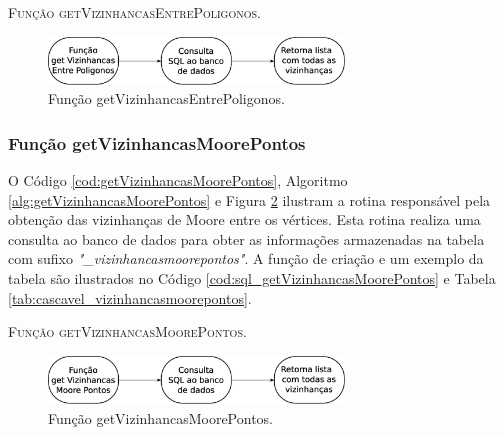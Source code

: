 \begin{algorithm}[H]
   \SetAlgoLined   
   
   \caption{\textsc{Função getVizinhancasEntrePoligonos.}}
   \label{alg:getVizinhancasEntrePoligonos}
\end{algorithm}

\begin{figure}[H]
  \centering
  \includegraphics[width=0.7\textwidth]{Figuras/Simula/Fluxos/getVizinhancasEntrePoligonos.eps}
  \caption{Função getVizinhancasEntrePoligonos.}
  \label{fig:getVizinhancasEntrePoligonos}
\end{figure} 

\newpage

\subsubsection{Função getVizinhancasMoorePontos}

O Código \ref{cod:getVizinhancasMoorePontos}, Algoritmo \ref{alg:getVizinhancasMoorePontos} e Figura \ref{fig:getVizinhancasMoorePontos} ilustram a rotina responsável pela obtenção das vizinhanças de Moore entre os vértices. Esta rotina realiza uma consulta ao banco de dados para obter as informações armazenadas na tabela com sufixo \textit{"\_vizinhancasmoorepontos"}. A função de criação e um exemplo da tabela são ilustrados no Código \ref{cod:sql_getVizinhancasMoorePontos} e Tabela \ref{tab:cascavel_vizinhancasmoorepontos}.  



\begin{algorithm}[H]
   \SetAlgoLined   
   
   \caption{\textsc{Função getVizinhancasMoorePontos.}}
   \label{alg:getVizinhancasMoorePontos}
\end{algorithm}

\begin{figure}[H]
  \centering
  \includegraphics[width=0.7\textwidth]{Figuras/Simula/Fluxos/getVizinhancasMoorePontos.eps}
  \caption{Função getVizinhancasMoorePontos.}
  \label{fig:getVizinhancasMoorePontos}
\end{figure} 

